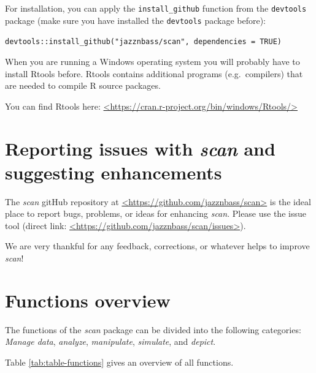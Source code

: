 \documentclass[
]{book}
\begin{document}
For installation, you can apply the \texttt{install\_github} function from the \texttt{devtools} package (make sure you have installed the \texttt{devtools} package before):

\texttt{devtools::install\_github("jazznbass/scan",\ dependencies\ =\ TRUE)}

When you are running a Windows operating system you will probably have to install Rtools before. Rtools contains additional programs (e.g.~compilers) that are needed to compile R source packages.

You can find Rtools here: \href{https://cran.r-project.org/bin/windows/Rtools/}{\textless https://cran.r-project.org/bin/windows/Rtools/\textgreater{}}

\hypertarget{reporting-issues-with-scan-and-suggesting-enhancements}{%
\section{\texorpdfstring{Reporting issues with \emph{scan} and suggesting enhancements}{Reporting issues with scan and suggesting enhancements}}\label{reporting-issues-with-scan-and-suggesting-enhancements}}

The \emph{scan} gitHub repository at \href{https://github.com/jazznbass/scan}{\textless https://github.com/jazznbass/scan\textgreater{}} is the ideal place to report bugs, problems, or ideas for enhancing \emph{scan}. Please use the issue tool (direct link: \href{https://github.com/jazznbass/scan/issues}{\textless https://github.com/jazznbass/scan/issues\textgreater{}}).

We are very thankful for any feedback, corrections, or whatever helps to improve \emph{scan}!

\hypertarget{functions-overview}{%
\section{Functions overview}\label{functions-overview}}

The functions of the \emph{scan} package can be divided into the following categories:\\
\emph{Manage data}, \emph{analyze}, \emph{manipulate}, \emph{simulate}, and \emph{depict}.

Table \ref{tab:table-functions} gives an overview of all functions.
\end{document}
